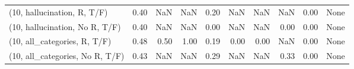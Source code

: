\begin{table*}[h!]
\begin{adjustbox}{width=2\columnwidth,center}
\begin{tabular}{lrrr|rrr|rrr}
(10, hallucination, R, T/F)           &                      0.40 &                   NaN &                       NaN &                          0.20 &                       NaN &                           NaN &                                    NaN &                               0.00 &                                  None \\
(10, hallucination, No R, T/F)        &                      0.40 &                   NaN &                       NaN &                          0.00 &                       NaN &                           NaN &                                   0.00 &                               0.00 &                                  None \\
(10, all\_categories, R, T/F)          &                      0.48 &                  0.50 &                      1.00 &                          0.19 &                      0.00 &                          0.00 &                                    NaN &                               0.00 &                                  None \\
(10, all\_categories, No R, T/F)       &                      0.43 &                   NaN &                       NaN &                          0.29 &                       NaN &                           NaN &                                   0.33 &                               0.00 &                                  None \\




\end{tabular}
\end{adjustbox}
\end{table*}
